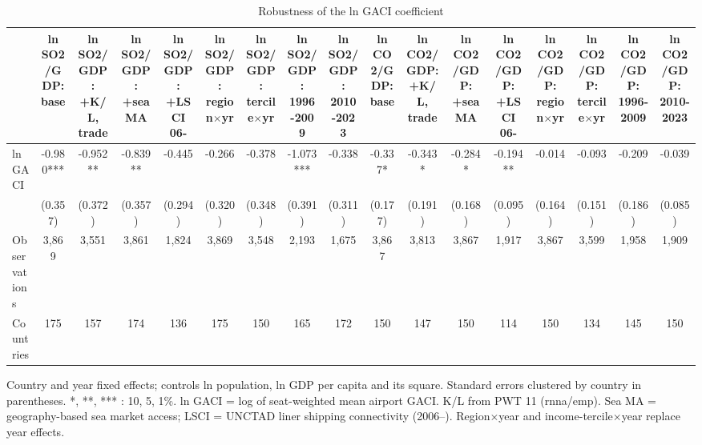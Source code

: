 \begin{table}[htbp]\centering\small
\caption{Robustness of the ln GACI coefficient}\label{tab:A1}
\begin{tabular}{lcccccccccccccccc}
\toprule
 & ln SO2/GDP: base & ln SO2/GDP: +K/L, trade & ln SO2/GDP: +sea MA & ln SO2/GDP: +LSCI 06- & ln SO2/GDP: region$\times$yr & ln SO2/GDP: tercile$\times$yr & ln SO2/GDP: 1996-2009 & ln SO2/GDP: 2010-2023 & ln CO2/GDP: base & ln CO2/GDP: +K/L, trade & ln CO2/GDP: +sea MA & ln CO2/GDP: +LSCI 06- & ln CO2/GDP: region$\times$yr & ln CO2/GDP: tercile$\times$yr & ln CO2/GDP: 1996-2009 & ln CO2/GDP: 2010-2023 \\
\midrule
ln GACI & -0.980*** & -0.952** & -0.839** & -0.445 & -0.266 & -0.378 & -1.073*** & -0.338 & -0.337* & -0.343* & -0.284* & -0.194** & -0.014 & -0.093 & -0.209 & -0.039 \\
 & (0.357) & (0.372) & (0.357) & (0.294) & (0.320) & (0.348) & (0.391) & (0.311) & (0.177) & (0.191) & (0.168) & (0.095) & (0.164) & (0.151) & (0.186) & (0.085) \\
\midrule
Observations & 3,869 & 3,551 & 3,861 & 1,824 & 3,869 & 3,548 & 2,193 & 1,675 & 3,867 & 3,813 & 3,867 & 1,917 & 3,867 & 3,599 & 1,958 & 1,909 \\
Countries & 175 & 157 & 174 & 136 & 175 & 150 & 165 & 172 & 150 & 147 & 150 & 114 & 150 & 134 & 145 & 150 \\
\bottomrule
\end{tabular}
\begin{minipage}{0.95\textwidth}\footnotesize Country and year fixed effects; controls ln population, ln GDP per capita and its square. Standard errors clustered by country in parentheses. *, **, *** : 10, 5, 1\%. ln GACI = log of seat-weighted mean airport GACI. K/L from PWT 11 (rnna/emp). Sea MA = geography-based sea market access; LSCI = UNCTAD liner shipping connectivity (2006--). Region$\times$year and income-tercile$\times$year replace year effects.\end{minipage}
\end{table}